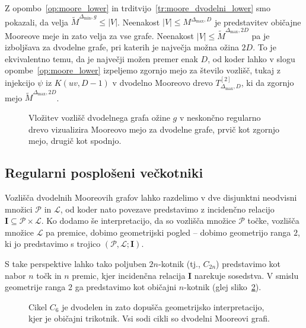 \documentclass[fin1, tisk]{fmfdelo}
\newcommand{\II}{\mathbf{I}}
\newcommand{\PP}{\mathcal{P}}
\newcommand{\LL}{\mathcal{L}}
\begin{document}
\begin{dokaz}
    Z opombo~\ref{op:moore_lower} in trditvijo~\ref{tr:moore_dvodelni_lower} smo pokazali, da velja
    $\widetilde{M}^{\Delta_{\min}, g} \leq |V|$. Ne\-ena\-kost $|V| \leq M^{\Delta_{\max}, D}$ 
    je predstavitev običajne Mooreove meje in zato velja za vse grafe.
    Neenakost $|V| \leq \widetilde{M}^{\Delta_{\max}, 2D}$ pa je izboljšava za dvodelne grafe, pri
    katerih je največja možna ožina $2D$. To je ekvivalentno temu, da je največji možen premer
    enak $D$, od koder lahko v slogu opombe~\ref{op:moore_lower} izpeljemo zgornjo mejo za število vozlišč,
    tukaj z injekcijo $\psi$ iz $K(uv, D-1)$ v dvodelno Mooreovo drevo $T^{[2]}_{\Delta_{\max}, D}$, ki da zgornjo mejo 
    $\widetilde{M}^{\Delta_{\max}, 2D}$.
\end{dokaz}


\begin{figure}[ht]
    \centering
    \def\svgwidth{\columnwidth}
    \caption{Vložitev vozlišč dvodelnega grafa ožine $g$ v neskončno regularno drevo vizualizira Mooreovo mejo za dvodelne grafe,
    prvič kot zgornjo mejo, drugič kot spodnjo.}
    \label{fig:vlozitev_v_drevo_dvodelni}
\end{figure}


\subsection{Regularni posplošeni večkotniki}

Vozlišča dvodelnih Mooreovih grafov lahko razdelimo v dve disjunktni neodvisni množici $\PP$ in $\LL$,
od koder nato povezave predstavimo z incidenčno relacijo $\II \subseteq \PP \times \LL$. Ko
dodamo še interpretacijo, da so vozlišča množice $\PP$ točke, vozlišča množice $\LL$ pa premice, dobimo
geometrijski pogled -- dobimo geometrijo ranga $2$, ki jo predstavimo s trojico $(\PP, \LL; \II)$. 

S take perspektive lahko tako poljuben $2n$-kotnik (tj., $C_{2n}$) 
predstavimo kot nabor $n$ točk in $n$ premic, kjer incidenčna relacija $\II$ narekuje sosedstva.
V smislu geometrije ranga 2 ga predstavimo kot običajni $n$-kotnik (glej sliko~\ref{fig:prehod_v_geometrijo_trikotnik}).


\begin{figure}[ht]
    \centering
    \def\svgwidth{\columnwidth}
    \caption{Cikel $C_6$ je dvodelen in zato dopušča geometrijsko interpretacijo, kjer je običajni trikotnik.
    Vsi sodi cikli so dvodelni Mooreovi grafi.}
    \label{fig:prehod_v_geometrijo_trikotnik}
\end{figure}
\end{document}

